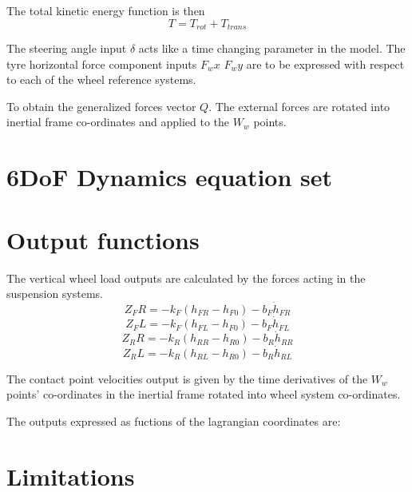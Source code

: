 The total kinetic energy function is then
$$ T = T_{rot} + T_{trans} $$

The steering angle input $\delta$ acts like a time changing parameter in the model.
The tyre horizontal force component inputs $F_wx$ $F_wy$ are to be expressed with respect to each of the wheel reference systems.

To obtain the generalized forces vector $Q$. The external forces are rotated into inertial frame co-ordinates and applied to the $W_w$ points.

\section{6DoF Dynamics equation set}
\label{sec:6dofeq}

\section{Output functions}
\label{sec:6dofout}
The vertical wheel load outputs are calculated by the forces acting in the suspension systems.
$$Z_FR = - k_F (h_{FR} - h_{F0}) - b_F \dot h_{FR} $$
$$Z_FL = - k_F (h_{FL} - h_{F0}) - b_F \dot h_{FL} $$
$$Z_RR = - k_R (h_{RR} - h_{R0}) - b_R \dot h_{RR} $$
$$Z_RL = - k_R (h_{RL} - h_{R0}) - b_R \dot h_{RL} $$

The contact point velocities output is given by the time derivatives of the $W_w$ points' co-ordinates in the inertial frame rotated into wheel system co-ordinates.

The outputs expressed as fuctions of the lagrangian coordinates are:

\section{Limitations}
\label{sec:6doflimits}
